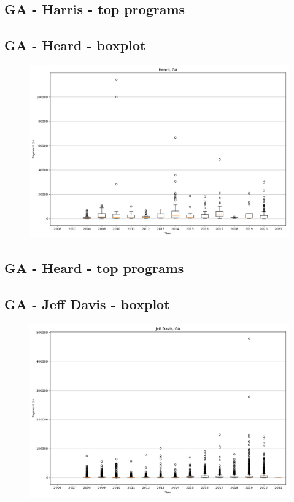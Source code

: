 \subsection*{GA - Harris - top programs}

\newpage
\subsection*{GA - Heard - boxplot}
\begin{figure}[h]
\centering
\includegraphics[width=7in]{../output/boxplots/counties/Heard-GA_boxplot.png}
\end{figure}


\subsection*{GA - Heard - top programs}

\newpage
\subsection*{GA - Jeff Davis - boxplot}
\begin{figure}[h]
\centering
\includegraphics[width=7in]{../output/boxplots/counties/Jeff Davis-GA_boxplot.png}
\end{figure}


